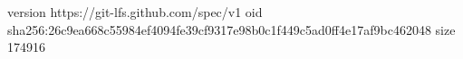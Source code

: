 version https://git-lfs.github.com/spec/v1
oid sha256:26c9ea668c55984ef4094fe39cf9317e98b0c1f449c5ad0ff4e17af9bc462048
size 174916
